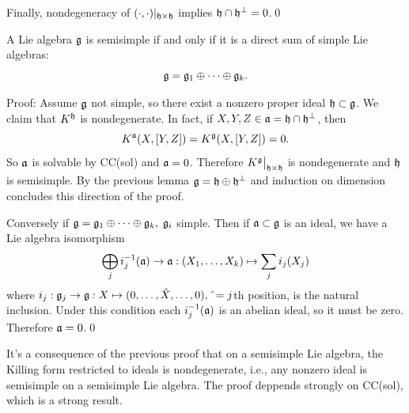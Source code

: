 Finally, nondegeneracy of $(\cdot,\cdot)|_{\mathfrak{h}\times\mathfrak{h}}$ implies $\mathfrak{h}\cap\mathfrak{h}^\perp=0$.\qed

\begin{dang}
    \begin{theorem}
        A Lie algebra $\mathfrak{g}$ is semisimple if and only if it is a direct sum of simple Lie algebras:
        \begin{equation}
            \mathfrak{g}=\mathfrak{g}_1\oplus\cdots\oplus\mathfrak{g}_k.
        \end{equation}
    \end{theorem}
\end{dang}
Proof: Assume $\mathfrak{g}$ not simple, so there exist a nonzero proper ideal $\mathfrak{h}\subset\mathfrak{g}$. We claim that 
$K^{\mathfrak{h}}$ is nondegenerate. In fact, if $X,Y,Z\in \mathfrak{a}=\mathfrak{h}\cap\mathfrak{h}^\perp$, then
\begin{equation}
    K^{\mathfrak{a}}(X,[Y,Z])=K^{\mathfrak{g}}(X,[Y,Z])=0.
\end{equation} 
So $\mathfrak{a}$ is solvable by CC(sol) and $\mathfrak{a}=0$. Therefore $K^{\mathfrak{g}}\big|_{\mathfrak{h}\times\mathfrak{h}}$ is nondegenerate and 
$\mathfrak{h}$ is semisimple. By the previous lemma $\mathfrak{g}=\mathfrak{h}\oplus\mathfrak{h}^\perp$ and induction on dimension concludes this 
direction of the proof.\par 
Conversely if $\mathfrak{g}=\mathfrak{g}_1\oplus\cdots\oplus\mathfrak{g}_k,\;\mathfrak{g}_i$ simple. Then if $\mathfrak{a}\subset\mathfrak{g}$ is an ideal, 
we have a Lie algebra isomorphism 
\begin{equation}
    \bigoplus_{j}i_j^{-1}(\mathfrak{a})\rightarrow\mathfrak{a}:(X_1,\dots,X_k)\mapsto \sum_ji_j(X_j)
\end{equation} 
where $i_j:\mathfrak{g}_j\to\mathfrak{g}:X\mapsto (0,\dots,\hat{X},\dots,0),\;\hat{}=j$th position, is the natural inclusion. Under this condition 
each $i_j^{-1}(\mathfrak{a})$ is an abelian ideal, so it must be zero. Therefore $\mathfrak{a}=0$.\qed

\begin{dang}
    \begin{remark}
        It's a consequence of the previous proof that on a semisimple Lie algebra, the Killing form restricted to ideals 
        is nondegenerate, i.e., any nonzero ideal is semisimple on a semisimple Lie algebra. The proof deppends strongly on 
        CC(sol), which is a strong result.
    \end{remark}
\end{dang}

